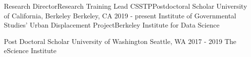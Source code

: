 

\begin{cventries}

  \cventry
    {Research Director{\enskip\cdotp\enskip}Research Training Lead CSSTP{\enskip\cdotp\enskip}Postdoctoral Scholar} %
    {University of California, Berkeley} %
    {Berkeley, CA} %
    {2019 - present} %
    {Institute of Governmental Studies' Urban Displacement ProjectBerkeley Institute for Data Science}

  \cventry
    {Post Doctoral Scholar} %
    {University of Washington} %
    {Seattle, WA} %
    {2017 - 2019} %
    {The eScience Institute}

\end{cventries}
